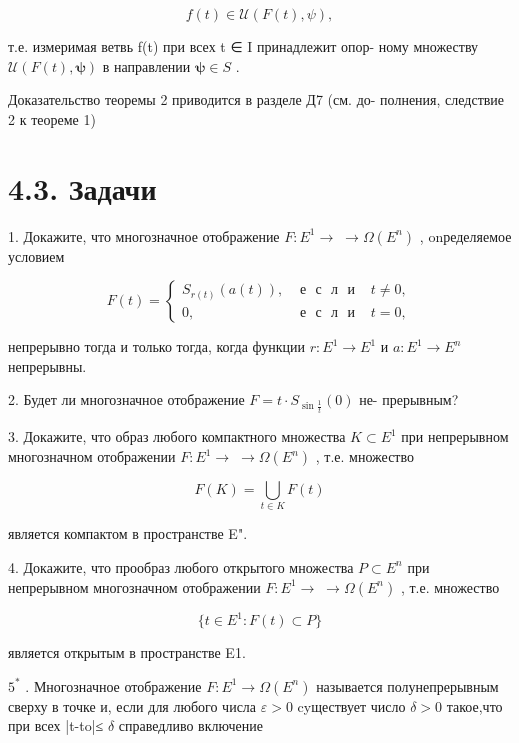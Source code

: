\documentclass[8pt]{extarticle}
\begin{document}
\[
f\left( t\right)  \in  \mathcal{U}\left( {F\left( t\right) ,\psi }\right) ,
\]

т.е. измеримая ветвь f(t) при всех t ∈ I принадлежит опор- ному множеству \(\mathcal{U}\left( {F\left( t\right) ,\mathbf{\psi }}\right)\) в направлении \(\mathbf{\psi } \in  S\) .

Доказательство теоремы 2 приводится в разделе Д7 (см. до- полнения, следствие 2 к теореме 1)

\section*{4.3. Задачи}

1. Докажите, что многозначное отображение \(F : {E}^{1} \rightarrow \; \rightarrow  \Omega \left( {E}^{n}\right)\) , onределяемое условием

\[
F\left( t\right)  = \left\{  \begin{array}{lll} {S}_{r\left( t\right) }\left( {a\left( t\right) }\right) , & \mathrm{{\text{ е }\text{ с }\text{ л }\text{ и }}} & t \neq  0, \\  0, & \mathrm{{\text{ е }\text{ с }\text{ л }\text{ и }}} & t = 0, \end{array}\right.
\]

непрерывно тогда и только тогда, когда функции \(r : {E}^{1} \rightarrow  {E}^{1}\) и \(a : {E}^{1} \rightarrow  {E}^{n}\) непрерывны.

2. Будет ли многозначное отображение \(F = t \cdot  {S}_{\sin \frac{1}{t}}\left( 0\right)\) не- прерывным?

3. Докажите, что образ любого компактного множества \(K \subset  {E}^{1}\) при непрерывном многозначном отображении \(F : {E}^{1} \rightarrow \; \rightarrow  \Omega \left( {E}^{n}\right)\) , т.е. множество

\[
F\left( K\right)  = \mathop{\bigcup }\limits_{{t \in  K}}F\left( t\right)
\]

является компактом в пространстве E".

4. Докажите, что прообраз любого открытого множества \(P \subset  {E}^{n}\) при непрерывном многозначном отображении \(F : {E}^{1} \rightarrow \; \rightarrow  \Omega \left( {E}^{n}\right)\) , т.е. множество

\[
\{ t \in  {E}^{1} : F\left( t\right)  \subset  P\}
\]

является открытым в пространстве E1.

\({5}^{ * }\) . Многозначное отображение \(F : {E}^{1} \rightarrow  \Omega \left( {E}^{n}\right)\) называется полунепрерывным сверху в точке и, если для любого числа \(\varepsilon  > 0\) cyществует число \(\delta  > 0\) такое,что при всех |t-to|≤ \(\delta\) справедливо включение
\end{document}
